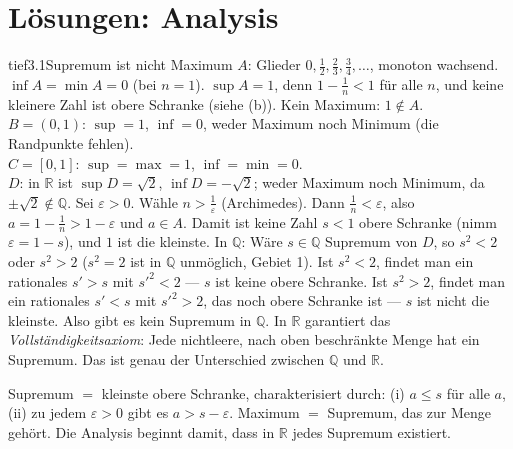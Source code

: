 \chapter{Lösungen: Analysis}

\begin{loesungkarte}{tief}{3.1}{Supremum ist nicht Maximum}
$A$: Glieder $0, \frac12, \frac23, \frac34, \dots$, monoton wachsend. $\inf A = \min A = 0$ (bei $n = 1$). $\sup A = 1$, denn $1 - \frac1n < 1$ für alle $n$, und keine kleinere Zahl ist obere Schranke (siehe (b)). Kein Maximum: $1\notin A$. \\
$B = (0, 1)$: $\sup = 1$, $\inf = 0$, weder Maximum noch Minimum (die Randpunkte fehlen). \\
$C = [0, 1]$: $\sup = \max = 1$, $\inf = \min = 0$. \\
$D$: in $\mathbb R$ ist $\sup D = \sqrt2$, $\inf D = -\sqrt2$; weder Maximum noch Minimum, da $\pm\sqrt2\notin\mathbb Q$.
Sei $\varepsilon > 0$. Wähle $n > \frac1\varepsilon$ (Archimedes). Dann $\frac1n < \varepsilon$, also $a = 1 - \frac1n > 1 - \varepsilon$ und $a\in A$. Damit ist keine Zahl $s < 1$ obere Schranke (nimm $\varepsilon = 1 - s$), und $1$ ist die kleinste.
In $\mathbb Q$: Wäre $s\in\mathbb Q$ Supremum von $D$, so $s^{2} < 2$ oder $s^{2} > 2$ ($s^{2} = 2$ ist in $\mathbb Q$ unmöglich, Gebiet 1). Ist $s^{2} < 2$, findet man ein rationales $s' > s$ mit $s'^{2} < 2$ --- $s$ ist keine obere Schranke. Ist $s^{2} > 2$, findet man ein rationales $s' < s$ mit $s'^{2} > 2$, das noch obere Schranke ist --- $s$ ist nicht die kleinste. Also gibt es kein Supremum in $\mathbb Q$. In $\mathbb R$ garantiert das \emph{Vollständigkeitsaxiom}: Jede nichtleere, nach oben beschränkte Menge hat ein Supremum. Das ist genau der Unterschied zwischen $\mathbb Q$ und $\mathbb R$.
\begin{mitnehmen}\kastentext
Supremum $=$ kleinste obere Schranke, charakterisiert durch: (i) $a\le s$ für alle $a$, (ii) zu jedem $\varepsilon > 0$ gibt es $a > s - \varepsilon$. Maximum $=$ Supremum, das zur Menge gehört. Die Analysis beginnt damit, dass in $\mathbb R$ jedes Supremum existiert.
\end{mitnehmen}
\end{loesungkarte}

